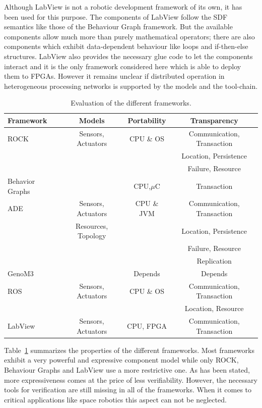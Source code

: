 \documentclass[a4paper,twocolumn]{esapub2005} %
\begin{document}
Although LabView is not a robotic development framework of its own, it has been used for this purpose.
The components of LabView follow the SDF semantics like those of the Behaviour Graph framework.
But the available components allow much more than purely mathematical operators; there are also components which exhibit data-dependent behaviour like loops and if-then-else structures.
LabView also provides the necessary glue code to let the components interact and it is the only framework considered here which is able to deploy them to FPGAs.
However it remains unclear if distributed operation in heterogeneous processing networks is supported by the models and the tool-chain.

\begin{table}
	\centering
	\begin{tabular}{l|ccc}
	\hline
	Framework        & Models & Portability & Transparency\\
	\hline
	ROCK             & Sensors, Actuators & CPU \& OS & Communication, Transaction\\
	                 & & & Location, Persistence\\
	                 & & & Failure, Resource\\                 
	Behavior Graphs  &        & CPU,$\mu$C & Transaction\\
	ADE              & Sensors, Actuators & CPU \& JVM & Communication, Transaction\\
	                 & Resources, Topology & & Location, Persistence\\
	                 & & & Failure, Resource\\
	                 & & & Replication\\
	GenoM3           &        & Depends & Depends\\
	ROS              & Sensors, Actuators & CPU \& OS  & Communication, Transaction\\
	                 & & & Location, Resource\\
	LabView          & Sensors, Actuators & CPU, FPGA  & Communication, Transaction\\
	\end{tabular}
    \caption{
        Evaluation of the different frameworks.
    }
    \label{table:summary}
\end{table}

Table~\ref{table:summary} summarizes the properties of the different frameworks.
Most frameworks exhibit a very powerful and expressive component model while only ROCK, Behaviour Graphs and LabView use a more restrictive one.
As has been stated, more expressiveness comes at the price of less verifiability.
However, the necessary tools for verification are still missing in all of the frameworks.
When it comes to critical applications like space robotics this aspect can not be neglected.
\end{document}
